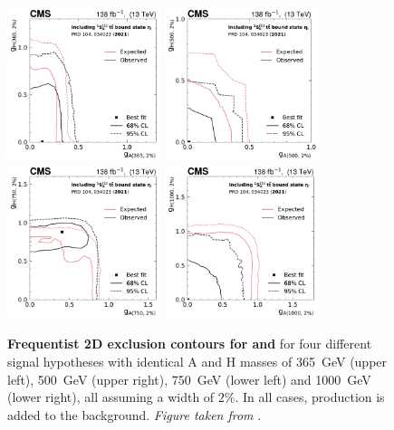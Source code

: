 \begin{figure}[!t]
    \centering
    \includegraphics[width=0.4\textwidth]{figures/ah/contour/A_m365_w2p0__H_m365_w2p0_fc-contour.pdf}%
    \hspace*{0.05\textwidth}%
    \includegraphics[width=0.4\textwidth]{figures/ah/contour/A_m500_w2p0__H_m500_w2p0_fc-contour.pdf} \\
    \includegraphics[width=0.4\textwidth]{figures/ah/contour/A_m750_w2p0__H_m750_w2p0_fc-contour.pdf}%
    \hspace*{0.05\textwidth}%
    \includegraphics[width=0.4\textwidth]{figures/ah/contour/A_m1000_w2p0__H_m1000_w2p0_fc-contour.pdf}
    \caption{%
        \textbf{Frequentist 2D exclusion contours for \gAtt and \gHtt} for four different signal hypotheses with identical A and H masses of \SI{365}{\GeV} (upper left), \SI{500}{\GeV} (upper right), \SI{750}{\GeV} (lower left) and \SI{1000}{\GeV} (lower right), all assuming a width of $2\%$. In all cases, \etat production is added to the background. \textit{Figure taken from }.
    }
    \label{fig:ah:limit_2D_ah_etat_0}
\end{figure}

